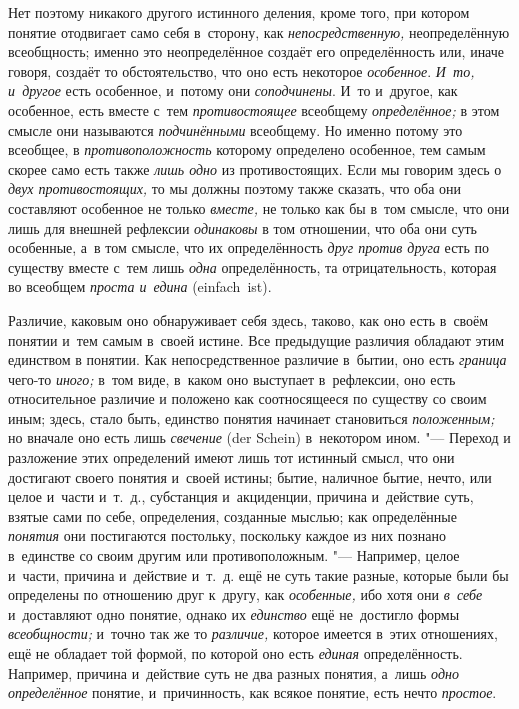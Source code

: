 \label{bkm:bm22a}Нет поэтому никакого другого истинного
деления, кроме того, при котором понятие отодвигает само себя в~сторону,
как {\em непосредственную,} неопределённую всеобщность; именно это
неопределённое создаёт его определённость или, иначе говоря,
создаёт то обстоятельство, что оно есть некоторое
{\em особенное}. {\em И~то, и~другое} есть особенное, и~потому они
{\em соподчинены}. И~то и~другое, как особенное, есть вместе с~тем
{\em противостоящее} всеобщему {\em определённое;} в
этом смысле они называются {\em подчинёнными}
всеобщему. Но именно потому это всеобщее, в {\em противоположность}
которому определено особенное, тем самым скорее само есть
также {\em лишь одно} из противостоящих. Если мы говорим здесь о
{\em двух противостоящих,}
то мы должны поэтому также сказать, что оба они составляют
особенное не только {\em вместе,} не только как бы в~том смысле,
что они лишь для внешней рефлексии {\em одинаковы}
в том отношении, что оба они суть особенные, а~в том смысле,
что их определённость {\em друг против
друга} есть по существу вместе с~тем лишь {\em одна}
определённость, та отрицательность, которая во всеобщем
{\em проста и~едина} (einfach~ist).

Различие, каковым оно обнаруживает себя здесь, таково, как оно
есть в~своём понятии и~тем самым в~своей истине. Все предыдущие различия
обладают этим единством в
понятии. Как непосредственное
различие в~бытии, оно есть {\em граница} чего-то {\em иного;} в~том
виде, в~каком оно выступает в~рефлексии, оно есть относительное различие и
положено как соотносящееся по существу со своим иным; здесь, стало быть,
единство понятия начинает становиться {\em положенным;} но вначале оно есть
лишь {\em свечение} (der Schein) в~некотором ином. "--- Переход и
разложение этих определений имеют лишь тот истинный смысл, что они
достигают своего понятия и~своей истины; бытие, наличное бытие, нечто, или
целое и~части и~т.~д., субстанция и~акциденции, причина и~действие суть,
взятые сами по себе, определения, созданные мыслью; как определённые
{\em понятия} они
постигаются постольку, поскольку каждое из них познано в~единстве со своим
другим или противоположным. "--- Например, целое и~части,
причина и~действие и~т.~д. ещё не суть такие разные, которые были бы
определены по отношению друг к~другу, как {\em особенные,} ибо хотя они
{\em в~себе} и~доставляют одно понятие, однако их {\em единство} ещё
не~достигло формы {\em всеобщности;} и~точно так же то {\em различие,} которое
имеется в~этих отношениях, ещё не обладает той формой, по которой оно есть
{\em единая} определённость. Например, причина и~действие суть не два разных
понятия, а~лишь {\em одно определённое} понятие, и~причинность, как всякое
понятие, есть нечто {\em простое}.

